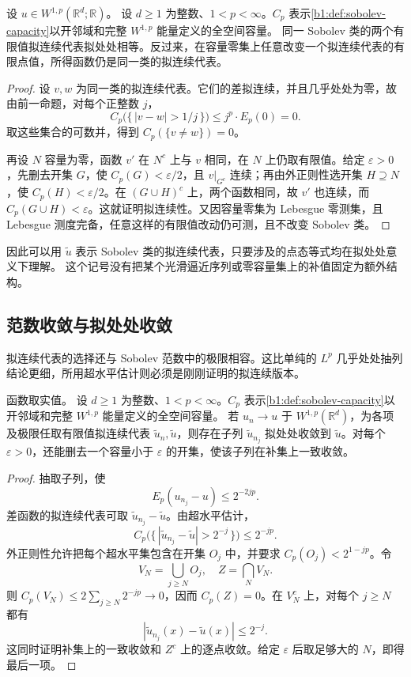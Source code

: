\begin{theorem}\label{b1:thm:quasicontinuous-uniqueness}
设 \(u\in W^{1,p}(\mathbb R^d;\mathbb R)\)。
设 \(d\geq1\) 为整数、\(1<p<\infty\)。\(C_p\) 表示\cref{b1:def:sobolev-capacity}以开邻域和完整 \(W^{1,p}\) 能量定义的全空间容量。
同一 Sobolev 类的两个有限值拟连续代表拟处处相等。反过来，在容量零集上任意改变一个拟连续代表的有限点值，所得函数仍是同一类的拟连续代表。
\end{theorem}
\begin{proof}
设 \(v,w\) 为同一类的拟连续代表。它们的差拟连续，并且几乎处处为零，故由前一命题，对每个正整数 \(j\)，
\[
 C_p\bigl(\{\,|v-w|>1/j\,\}\bigr)
 \leq j^p\cdot E_p(0)=0.
\]
取这些集合的可数并，得到 \(C_p(\{v\ne w\})=0\)。

再设 \(N\) 容量为零，函数 \(v'\) 在 \(N^c\) 上与 \(v\) 相同，在 \(N\) 上仍取有限值。给定 \(\varepsilon>0\)，先删去开集 \(G\)，使
\(C_p(G)<\varepsilon/2\)，且 \(v|_{G^c}\) 连续；再由外正则性选开集 \(H\supseteq N\)，使 \(C_p(H)<\varepsilon/2\)。在
\((G\cup H)^c\) 上，两个函数相同，故 \(v'\) 也连续，而
\(C_p(G\cup H)<\varepsilon\)。这就证明拟连续性。又因容量零集为 Lebesgue 零测集，且 Lebesgue 测度完备，任意这样的有限值改动仍可测，且不改变 Sobolev 类。
\end{proof}

因此可以用 \(\widetilde u\) 表示 Sobolev 类的拟连续代表，只要涉及的点态等式均在拟处处意义下理解。%
这个记号没有把某个光滑逼近序列或零容量集上的补值固定为额外结构。

\subsection{范数收敛与拟处处收敛}
\label{b1:subsec:260204}

拟连续代表的选择还与 Sobolev 范数中的极限相容。这比单纯的 \(L^p\) 几乎处处抽列结论更细，所用超水平估计则必须是刚刚证明的拟连续版本。

\begin{theorem}\label{b1:thm:sobolev-quasi-everywhere-subsequence}
函数取实值。
设 \(d\geq1\) 为整数、\(1<p<\infty\)。\(C_p\) 表示\cref{b1:def:sobolev-capacity}以开邻域和完整 \(W^{1,p}\) 能量定义的全空间容量。
若 \(u_n\to u\) 于 \(W^{1,p}(\mathbb R^d)\)，为各项及极限任取有限值拟连续代表 \(\widetilde u_n,\widetilde u\)，则存在子列
\(\widetilde u_{n_j}\) 拟处处收敛到 \(\widetilde u\)。对每个 \(\varepsilon>0\)，还能删去一个容量小于 \(\varepsilon\) 的开集，使该子列在补集上一致收敛。
\end{theorem}
\begin{proof}
抽取子列，使
\[
 E_p(u_{n_j}-u)\leq2^{-2jp}.
\]
差函数的拟连续代表可取
\(\widetilde u_{n_j}-\widetilde u\)。由超水平估计，
\[
 C_p\bigl(\{\,|\widetilde u_{n_j}-\widetilde u|>2^{-j}\,\}\bigr)
 \leq2^{-jp}.
\]
外正则性允许把每个超水平集包含在开集 \(O_j\) 中，并要求
\(C_p(O_j)<2^{1-jp}\)。令
\[
 V_N=\bigcup_{j\geq N}O_j,\quad Z=\bigcap_NV_N.
\]
则 \(C_p(V_N)\leq2\sum_{j\geq N}2^{-jp}\to0\)，因而 \(C_p(Z)=0\)。在 \(V_N^c\) 上，对每个 \(j\geq N\) 都有
\[
 |\widetilde u_{n_j}(x)-\widetilde u(x)|\leq2^{-j}.
\]
这同时证明补集上的一致收敛和 \(Z^c\) 上的逐点收敛。给定 \(\varepsilon\) 后取足够大的 \(N\)，即得最后一项。
\end{proof}


